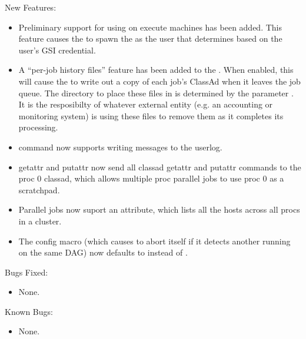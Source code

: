 \noindent New Features:

\begin{itemize}


\item Preliminary support for using  on execute machines
has been added.  This feature causes the  to spawn the
 as the user that  determines based on
the user's GSI credential.

\item A ``per-job history files'' feature has been added to the
. When enabled, this will cause the  to
write out a copy of each job's ClassAd when it leaves the job
queue. The directory to place these files in is determined by the
parameter . It is the resposibilty of
whatever external entity (e.g. an accounting or monitoring system) is
using these files to remove them as it completes its processing.

\item {} command now supports writing messages to the userlog.

\item {} getattr and putattr now send all classad getattr
and putattr commands to the proc 0 classad, which allows multiple proc
parallel jobs to use proc 0 as a scratchpad.

\item Parallel jobs now suport an  attribute,
which lists all the hosts across all procs in a cluster.

\item The  config macro (which causes
 to abort itself if it detects another 
running on the same DAG) now defaults to  instead of
.

\end{itemize}

\noindent Bugs Fixed:

\begin{itemize}

\item None.

\end{itemize}

\noindent Known Bugs:

\begin{itemize}

\item None.

\end{itemize}

